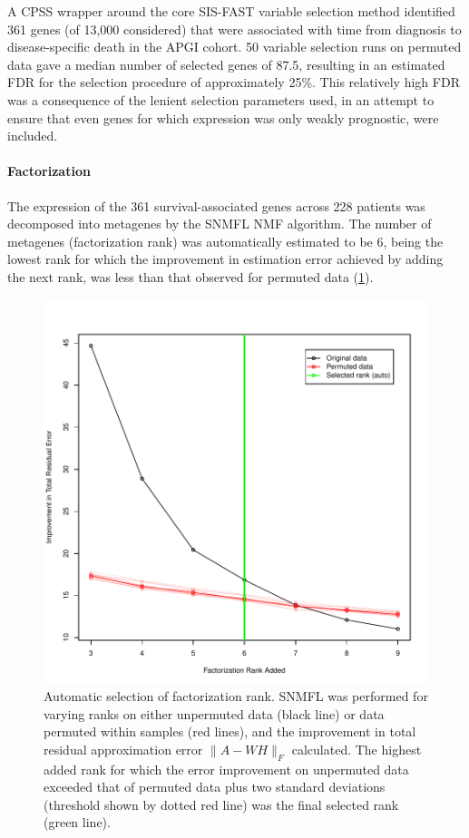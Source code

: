 \documentclass[dissertation.tex]{subfiles}
\begin{document}
A \gls{CPSS} wrapper around the core \gls{SIS}-\gls{FAST} variable selection method \cite{Gorst-Rasmussen2013} identified 361 genes (of 13,000 considered) that were associated with time from diagnosis to disease-specific death in the \gls{APGI} cohort.  50 variable selection runs on permuted data gave a median number of selected genes of 87.5, resulting in an estimated \gls{FDR} for the selection procedure of approximately 25\%.  This relatively high \gls{FDR} was a consequence of the lenient selection parameters used, in an attempt to ensure that even genes for which expression was only weakly prognostic, were included.

\paragraph{Factorization}
The expression of the 361 survival-associated genes across 228 patients was decomposed into metagenes by the \gls{SNMFL} \gls{NMF} algorithm.  The number of metagenes (factorization rank) was automatically estimated to be 6, being the lowest rank for which the improvement in estimation error achieved by adding the next rank, was less than that observed for permuted data (\cref{fig:sigs-nmf-rank}).

\begin{figure}
\centering
\includegraphics[width=.7\linewidth]{analysis/biosurv/reports/18_SIS_diag_dsd_final/figure/nmf-rank-plots-2}
\caption{Automatic selection of factorization rank.  \acrshort{SNMFL} was performed for varying ranks on either unpermuted data (black line) or data permuted within samples (red lines), and the improvement in total residual approximation error $\|A - W H\|_F$ calculated.  The highest added rank for which the error improvement on unpermuted data exceeded that of permuted data plus two standard deviations (threshold shown by dotted red line) was the final selected rank (green line).\label{fig:sigs-nmf-rank}}
\end{figure}
\end{document}
